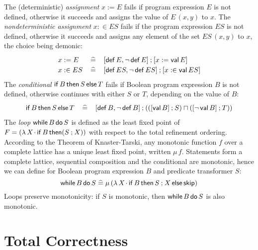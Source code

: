 \documentclass[submission,copyright,creativecommons]{eptcs}
\newcommand{\KW}[1]{\mathop{\sf #1}}
\newcommand{\SKIP}{\KW{skip}}
\newcommand{\semi}{\mathbin{;}}
\newcommand{\meet}{\sqcap}
\newcommand{\IF}{\KW{if}}
\newcommand{\THEN}{\KW{then}}
\newcommand{\ELSE}{\KW{else}}
\newcommand{\WHILE}{\KW{while}}
\newcommand{\DO}{\KW{do}}
\newcommand{\DEF}{\KW{def}}
\newcommand{\VAL}{\KW{val}}
\renewcommand{\dot}{\mathop{.}}
\newcommand{\defeq}{\left.\widehat{=}\right.}
\begin{document}
The (deterministic) \emph{assignment} $x := E$ fails if program expression $E$ is not defined, otherwise it succeeds and assigns the value of $E\,(x, y)$ to $x$. The {\em nondeterministic assignment} $x :\in ES$ fails if the program expression $ES$ is not defined, otherwise it succeeds and assigns any element of the set $ES\,(x, y)$ to $x$, the choice being demonic:
\[\renewcommand{\arraystretch}{1.2}\begin{array}{lcl}
  x := E   & \defeq & [\DEF E, \neg \DEF E] \semi [x := \VAL E] \\
  x :\in ES & \defeq & [\DEF ES, \neg \DEF ES] \semi [x :\in \VAL ES]
\end{array}\]
The {\em conditional} $\IF B \THEN S \ELSE T$ fails if Boolean program expression $B$ is not defined, otherwise continues with either $S$ or $T$, depending on the value of $B$:
\[\renewcommand{\arraystretch}{1.2}\begin{array}{rcl}
\IF B \THEN S \ELSE T & \defeq & [\DEF B, \neg \DEF B] \semi (([\VAL B] \semi S) \meet ([\neg \VAL B] \semi T))
\end{array}\]
The {\em loop} $\WHILE B \DO S$ is defined as the least fixed point of $F = (\lambda\,X \dot \IF B \THEN (S \semi X))$ with respect to the total refinement ordering. According to the Theorem of Knaster-Tarski, any monotonic function $f$ over a complete lattice has a unique least fixed point, written $\mu\,f$. Statements form a complete lattice, sequential composition and the conditional are monotonic, hence we can define for Boolean program expression $B$ and predicate transformer $S$:
\[\WHILE B \DO S \defeq \mu\,(\lambda\,X \dot \IF B \THEN S \semi X \ELSE \SKIP)\]
Loops preserve monotonicity: if $S$ is monotonic, then $\WHILE B \DO S$ is also monotonic.

\section{Total Correctness}
\label{sec:toco}
\end{document}

